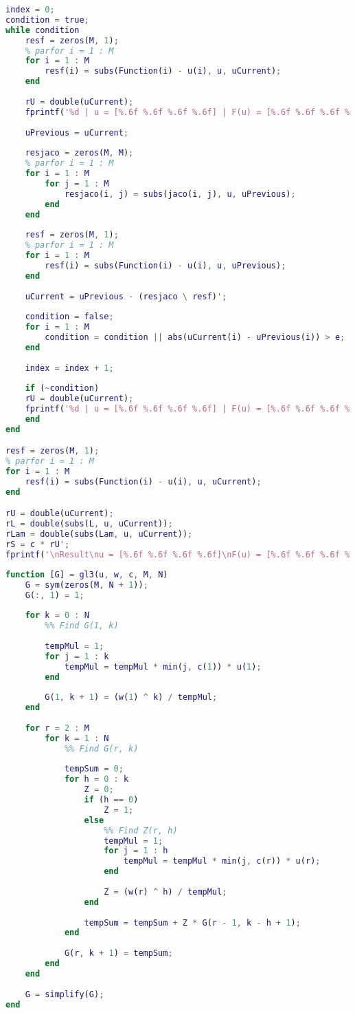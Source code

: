 \begin{lstlisting}[language={matlab}, caption={Решение СМО методом Ньютона}, label={lst:0}, basicstyle={\footnotesize\ttfamily}, breaklines={true}]
index = 0;
condition = true;
while condition
	resf = zeros(M, 1);
	% parfor i = 1 : M
	for i = 1 : M
		resf(i) = subs(Function(i) - u(i), u, uCurrent);
	end
	
	rU = double(uCurrent);
	fprintf('%d | u = [%.6f %.6f %.6f %.6f] | F(u) = [%.6f %.6f %.6f %.6f] | S = %.6f\n', index, double(uCurrent), double(resf), c * rU');
	
	uPrevious = uCurrent;
	
	resjaco = zeros(M, M);
	% parfor i = 1 : M
	for i = 1 : M
		for j = 1 : M
			resjaco(i, j) = subs(jaco(i, j), u, uPrevious);
		end
	end
	
	resf = zeros(M, 1);
	% parfor i = 1 : M
	for i = 1 : M
		resf(i) = subs(Function(i) - u(i), u, uPrevious);
	end
	
	uCurrent = uPrevious - (resjaco \ resf)';
	
	condition = false;
	for i = 1 : M
		condition = condition || abs(uCurrent(i) - uPrevious(i)) > e;
	end
	
	index = index + 1;
	
	if (~condition)
	rU = double(uCurrent);
	fprintf('%d | u = [%.6f %.6f %.6f %.6f] | F(u) = [%.6f %.6f %.6f %.6f] | S = %.6f\n', index, double(uCurrent), double(resf), c * rU');
	end
end

resf = zeros(M, 1);
% parfor i = 1 : M
for i = 1 : M
	resf(i) = subs(Function(i) - u(i), u, uCurrent);
end

rU = double(uCurrent);
rL = double(subs(L, u, uCurrent));
rLam = double(subs(Lam, u, uCurrent));
rS = c * rU';
fprintf('\nResult\nu = [%.6f %.6f %.6f %.6f]\nF(u) = [%.6f %.6f %.6f %.6f]\nL(N) = [%.6f %.6f %.6f %.6f]\nlam(N) = [%.6f %.6f %.6f %.6f]\nS = %.6f\n', rU, double(resf), rL, rLam, rS);

\end{lstlisting}

\begin{lstlisting}[language={matlab}, caption={Расчет нормирующей константы}, label={lst:0}, basicstyle={\footnotesize\ttfamily}, breaklines={true}]
function [G] = gl3(u, w, c, M, N)
	G = sym(zeros(M, N + 1));
	G(:, 1) = 1;
	
	for k = 0 : N
		%% Find G(1, k)
		
		tempMul = 1;
		for j = 1 : k
			tempMul = tempMul * min(j, c(1)) * u(1);
		end
		
		G(1, k + 1) = (w(1) ^ k) / tempMul;
	end
	
	for r = 2 : M
		for k = 1 : N
			%% Find G(r, k)
			
			tempSum = 0;
			for h = 0 : k
				Z = 0;
				if (h == 0)
					Z = 1;
				else
					%% Find Z(r, h)
					tempMul = 1;
					for j = 1 : h
						tempMul = tempMul * min(j, c(r)) * u(r);
					end
			
					Z = (w(r) ^ h) / tempMul;
				end
			
				tempSum = tempSum + Z * G(r - 1, k - h + 1);
			end
			
			G(r, k + 1) = tempSum;
		end
	end
	
	G = simplify(G);
end
\end{lstlisting}

